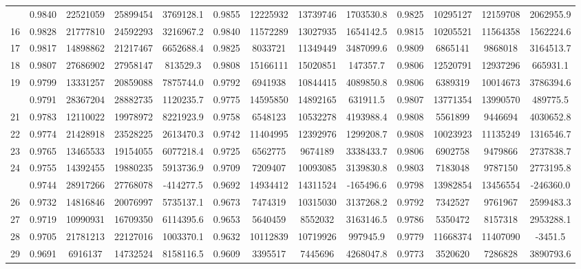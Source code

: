 \documentclass[
  12pt,
]{article}
\begin{document}
\begin{longtable}[t]{lcccccccccccc}
\addlinespace
15 & 0.9840 & 22521059 & 25899454 & 3769128.1 & 0.9855 & 12225932 & 13739746 & 1703530.8 & 0.9825 & 10295127 & 12159708 & 2062955.9\\
16 & 0.9828 & 21777810 & 24592293 & 3216967.2 & 0.9840 & 11572289 & 13027935 & 1654142.5 & 0.9815 & 10205521 & 11564358 & 1562224.6\\
17 & 0.9817 & 14898862 & 21217467 & 6652688.4 & 0.9825 & 8033721 & 11349449 & 3487099.6 & 0.9809 & 6865141 & 9868018 & 3164513.7\\
18 & 0.9807 & 27686902 & 27958147 & 813529.3 & 0.9808 & 15166111 & 15020851 & 147357.7 & 0.9806 & 12520791 & 12937296 & 665931.1\\
19 & 0.9799 & 13331257 & 20859088 & 7875744.0 & 0.9792 & 6941938 & 10844415 & 4089850.8 & 0.9806 & 6389319 & 10014673 & 3786394.6\\
\addlinespace
20 & 0.9791 & 28367204 & 28882735 & 1120235.7 & 0.9775 & 14595850 & 14892165 & 631911.5 & 0.9807 & 13771354 & 13990570 & 489775.5\\
21 & 0.9783 & 12110022 & 19978972 & 8221923.9 & 0.9758 & 6548123 & 10532278 & 4193988.4 & 0.9808 & 5561899 & 9446694 & 4030652.8\\
22 & 0.9774 & 21428918 & 23528225 & 2613470.3 & 0.9742 & 11404995 & 12392976 & 1299208.7 & 0.9808 & 10023923 & 11135249 & 1316546.7\\
23 & 0.9765 & 13465533 & 19154055 & 6077218.4 & 0.9725 & 6562775 & 9674189 & 3338433.7 & 0.9806 & 6902758 & 9479866 & 2737838.7\\
24 & 0.9755 & 14392455 & 19880235 & 5913736.9 & 0.9709 & 7209407 & 10093085 & 3139830.8 & 0.9803 & 7183048 & 9787150 & 2773195.8\\
\addlinespace
25 & 0.9744 & 28917266 & 27768078 & -414277.5 & 0.9692 & 14934412 & 14311524 & -165496.6 & 0.9798 & 13982854 & 13456554 & -246360.0\\
26 & 0.9732 & 14816846 & 20076997 & 5735137.1 & 0.9673 & 7474319 & 10315030 & 3137268.2 & 0.9792 & 7342527 & 9761967 & 2599483.3\\
27 & 0.9719 & 10990931 & 16709350 & 6114395.6 & 0.9653 & 5640459 & 8552032 & 3163146.5 & 0.9786 & 5350472 & 8157318 & 2953288.1\\
28 & 0.9705 & 21781213 & 22127016 & 1003370.1 & 0.9632 & 10112839 & 10719926 & 997945.9 & 0.9779 & 11668374 & 11407090 & -3451.5\\
29 & 0.9691 & 6916137 & 14732524 & 8158116.5 & 0.9609 & 3395517 & 7445696 & 4268047.8 & 0.9773 & 3520620 & 7286828 & 3890793.6\\

\end{longtable}
\end{document}
